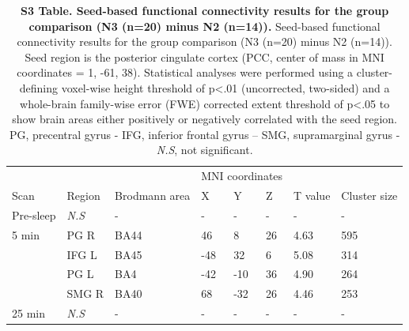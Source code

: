 \begin{table}[htbp]
    \caption*{\textbf{S3 Table. Seed-based functional connectivity results for the group comparison (N3 (n=20) minus N2 (n=14)).} Seed-based functional connectivity results for the group comparison (N3 (n=20) minus N2 (n=14)). Seed region is the posterior cingulate cortex (PCC, center of mass in MNI coordinates = 1, -61, 38). Statistical analyses were performed using a cluster-defining voxel-wise height threshold of p<.01 (uncorrected, two-sided) and a whole-brain family-wise error (FWE) corrected extent threshold of p<.05 to show brain areas either positively or negatively correlated with the seed region. PG, precentral gyrus - IFG, inferior frontal gyrus – SMG, supramarginal gyrus - \textit{N.S}, not significant.}
    \begin{tabularx}{\textwidth}{lXXllllX}
    \toprule
    &         &                 & \multicolumn{3}{c}{MNI coordinates}                 &              &              \\
    Scan      & Region    		& Brodmann area & X          & Y          & Z         & T value 	 & Cluster size \\ \midrule
    Pre-sleep & \textit{N.S} 	& -             & -          & -          & -         & -            & -            \\
    5 min     & PG R 			& BA44          & 46         & 8          & 26        & 4.63         & 595          \\
              & IFG L           & BA45          & -48        & 32         & 6         & 5.08         & 314          \\
              & PG L 			& BA4           & -42        & -10        & 36        & 4.90         & 264          \\
              & SMG R           & BA40          & 68         & -32        & 26        & 4.46         & 253          \\
    25 min    & \textit{N.S}    & -             & -          & -          & -         & -            & -            \\ \toprule
    \end{tabularx}%
\end{table}
